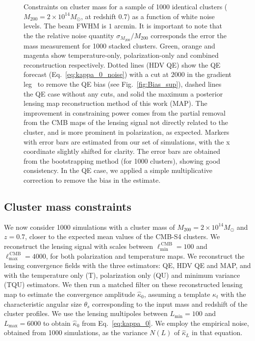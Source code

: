 \documentclass[prd, superscriptaddress, tightenlines, longbibliography, nofootinbib, eqsecnum, amsfonts, amsmath, floatfix, twocolumn, notitlepage]{revtex4-2}
\begin{document}
\begin{figure}
	\caption{Constraints on cluster mass for a sample of 1000 identical clusters ($M_{200} = 2\times10^{14}M_{\odot}$, at redshift 0.7) as a function of white noise levels. The beam FWHM is $1$ arcmin. It is important to note that the the relative noise quantity $\sigma_{M_{200}}/M_{200}$ corresponds the error the mass measurement for 1000 stacked clusters. Green, orange and magenta show temperature-only, polarization-only and combined reconstruction respectively. Dotted lines (HDV QE) show the QE forecast (Eq.~\ref{eq:kappa_0_noise}) with a cut at $2000$ in the gradient leg~\cite{Hu:2007bt} to remove the QE bias (see Fig.~\ref{fig:Bias_sup}), dashed lines the QE case without any cuts, and solid the maximum a posterior lensing map reconstruction method of this work (MAP). The improvement in constraining power comes from the partial removal from the CMB maps of the lensing signal not directly related to the cluster, and is more prominent in polarization, as expected. Markers with error bars are estimated from our set of simulations, with the x coordinate slightly shifted for clarity. The error bars are obtained from the bootstrapping method (for 1000 clusters), showing good consistency. In the QE case, we applied a simple multiplicative correction to remove the bias in the estimate.}
	\label{fig:forecast}
\end{figure}

\subsection{Cluster mass constraints}
\label{subsec:clustermass}

We now consider 1000 simulations with a cluster mass of $M_{200} = 2 \times 10^{14} M_{\odot}$ and $z=0.7$, closer to the expected mean values of the CMB-S4 clusters. We reconstruct the lensing signal with scales between  $\ell_{\text{min}}^{\, \text{CMB}}=100$ and $\ell_{\text{max}}^{\, \text{CMB}} = 4000$, for both polarization and temperature maps. We reconstruct the lensing convergence fields with the three estimators: QE, HDV QE and MAP, and with the temperature only (T), polarization only (QU) and minimum variance (TQU) estimators. We then run a matched filter on these reconstructed lensing map to estimate the convergence amplitude $\hat \kappa_0$, assuming a template $\kappa_t$ with the characteristic angular size $\theta_s$ corresponding to the input mass and redshift of the cluster profiles.
We use the lensing multipoles between $L_{\text{min}}=100$ and $L_{\text{max}}=6000$ to obtain $\hat \kappa_0$ from Eq.~\ref{eq:kappa_0}. We employ the empirical noise, obtained from 1000 simulations, as the variance $N(L)$ of $\hat \kappa_{L}$ in that equation.
\end{document}
